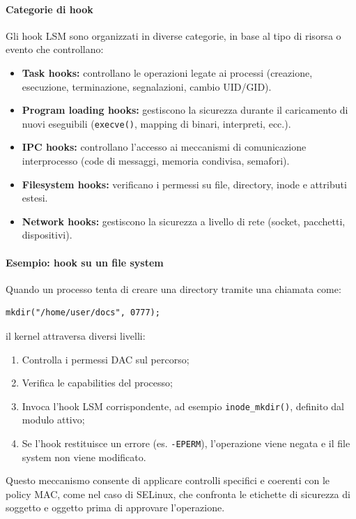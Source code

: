 \paragraph{Categorie di hook}
Gli hook LSM sono organizzati in diverse categorie, in base al tipo di risorsa o evento che controllano:
\begin{itemize}
  \item \textbf{Task hooks:} controllano le operazioni legate ai processi (creazione, esecuzione, terminazione, segnalazioni, cambio UID/GID).
  \item \textbf{Program loading hooks:} gestiscono la sicurezza durante il caricamento di nuovi eseguibili (\texttt{execve()}, mapping di binari, interpreti, ecc.).
  \item \textbf{IPC hooks:} controllano l’accesso ai meccanismi di comunicazione interprocesso (code di messaggi, memoria condivisa, semafori).
  \item \textbf{Filesystem hooks:} verificano i permessi su file, directory, inode e attributi estesi.
  \item \textbf{Network hooks:} gestiscono la sicurezza a livello di rete (socket, pacchetti, dispositivi).
\end{itemize}

\paragraph{Esempio: hook su un file system}
Quando un processo tenta di creare una directory tramite una chiamata come:
\begin{verbatim}
mkdir("/home/user/docs", 0777);
\end{verbatim}
il kernel attraversa diversi livelli:
\begin{enumerate}
  \item Controlla i permessi DAC sul percorso;
  \item Verifica le capabilities del processo;
  \item Invoca l’hook LSM corrispondente, ad esempio \texttt{inode\_mkdir()}, definito dal modulo attivo;
  \item Se l’hook restituisce un errore (es. \texttt{-EPERM}), l’operazione viene negata e il file system non viene modificato.
\end{enumerate}
Questo meccanismo consente di applicare controlli specifici e coerenti con le policy MAC, come nel caso di SELinux, che confronta le etichette di sicurezza di soggetto e oggetto prima di approvare l’operazione.

